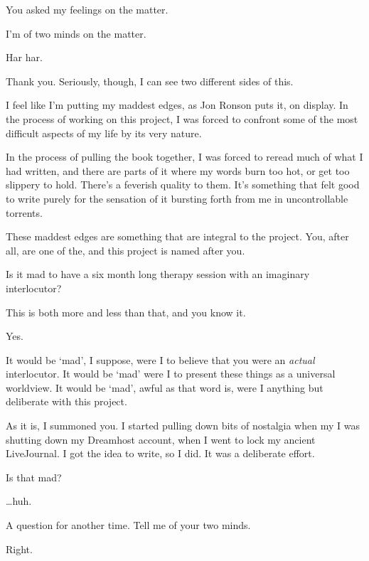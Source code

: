 \begin{paracol}{2}
\begin{leftcolumn}
\begin{ally}
You asked my feelings on the matter.
\end{ally}
I'm of two minds on the matter.

\begin{ally}
Har har.
\end{ally}
Thank you. Seriously, though, I can see two different sides of this.

I feel like I'm putting my maddest edges, as Jon Ronson puts it, on display. In the process of working on this project, I was forced to confront some of the most difficult aspects of my life by its very nature.

In the process of pulling the book together, I was forced to reread much of what I had written, and there are parts of it where my words burn too hot, or get too slippery to hold. There's a feverish quality to them. It's something that felt good to write purely for the sensation of it bursting forth from me in uncontrollable torrents.

These maddest edges are something that are integral to the project. You, after all, are one of the, and this project is named after you.

\begin{ally}
Is it mad to have a six month long therapy session with an imaginary interlocutor?
\end{ally}
This is both more and less than that, and you know it.

\begin{ally}
Yes.
\end{ally}
It would be `mad', I suppose, were I to believe that you were an \emph{actual} interlocutor. It would be `mad' were I to present these things as a universal worldview. It would be `mad', awful as that word is, were I anything but deliberate with this project.

As it is, I summoned you. I started pulling down bits of nostalgia when my I was shutting down my Dreamhost account, when I went to lock my ancient LiveJournal. I got the idea to write, so I did. It was a deliberate effort.

\begin{ally}
Is that mad?
\end{ally}
\ldots{}huh.

\begin{ally}
A question for another time. Tell me of your two minds.
\end{ally}
Right.


\end{leftcolumn}
\end{paracol}
